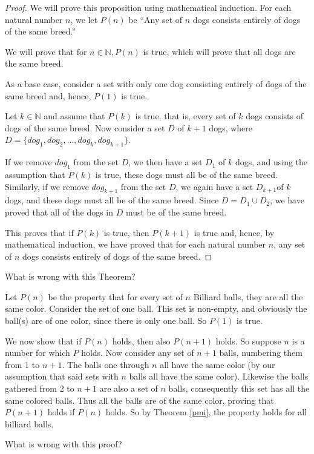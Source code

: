 \begin{theorem}

\begin{proof}    We will prove this proposition using mathematical induction. For each natural number $n$, we let $P(n)$ be ``Any set of $n$ dogs consists entirely of dogs of the same breed.''


We will prove that for $n\in\mathbb{N}, P(n)$ is true, which will prove that all dogs are the same breed. 

As a base case, consider a set with only one dog consisting entirely of dogs of the same breed and, hence, $P(1)$ is true.

Let $k\in\mathbb{N}$ and assume that $P(k)$ is true, that is,  every set of $k$ dogs consists of dogs of the same breed. Now consider a set $D$ of $k+1$ dogs, where $D=\{dog_1, dog_2,..., dog_k, dog_{k+1}\}$.

If we remove $dog_1$ from the set $D$, we then have a set $D_1$ of $k$ dogs, and using the assumption that $P(k)$ is true, these dogs must all be of the same breed. Similarly, if we remove $dog_{k+1}$ from the set $D$, we again have a set $D_{k+1}$of $k$ dogs, and these dogs must all be of the same breed. Since $D = D_1\cup D_2$, we have proved that all of the dogs in $D$ must be of the same breed.

This proves that if $P(k)$
is true, then $P(k+1)$ is true and, hence, by mathematical induction, we have proved that for each natural number $n$, any set of $n$ dogs consists entirely of dogs of the same breed.
\end{proof}
What is wrong with this Theorem?
\end{theorem}

\newpage
\begin{problem}
Let $P(n)$ be the property that for every set of $n$ Billiard balls, they are all the same color.  Consider the set of one ball.  This set is non-empty, and obviously the ball(s) are of one color, since there is only one ball.  So $P(1)$ is true.

We now show that if $P(n)$ holds, then also $P(n+1)$ holds.  So suppose $n$ is a number for which $P$ holds.  Now consider any set of $n+1$ balls, numbering them from 1 to $n+1$.  The balls one through $n$ all have the same color (by our assumption that said sets with $n$ balls all have the same color).  Likewise the balls gathered from 2 to $n+1$ are also a set of $n$ balls, consequently this set has all the same colored balls.  Thus all the balls are of the same color, proving that $P(n+1)$ holds if $P(n)$ holds.  So by Theorem \ref{pmi}, the property holds for all billiard balls.

What is wrong with this proof?

\end{problem}


